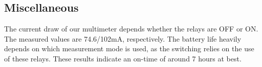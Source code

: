 \subsection{Miscellaneous}
\label{sec:discussion_misc}
The current draw of our multimeter depends whether the relays are OFF or ON. The measured values are 74.6/102mA, respectively. The battery life heavily depends on which measurement mode is used, as the switching relies on the use of these relays. These results indicate an on-time of around 7 hours at best.